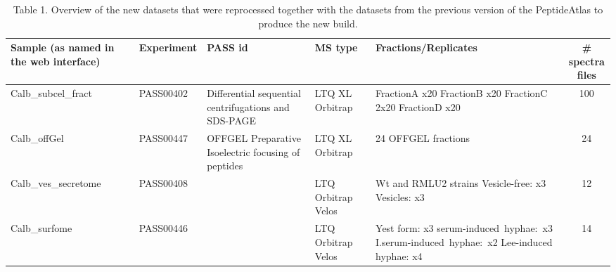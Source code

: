 \begin{otherlanguage}{british}
\begin{table}[t]
\renewcommand{\arraystretch}{1.5}
\caption*{Table 1. Overview of the new datasets that were reprocessed together with the datasets from the previous version of the PeptideAtlas to produce the
new build.}
\footnotesize
\centering
\begin{tabular}{p{2cm} p{1cm} p{2cm} p{1cm} p{2cm} c }
\hline
{\scriptsize Sample \newline (as named in \newline the web interface)} & {\scriptsize Experiment } & {\scriptsize PASS id } & {\scriptsize MS type } & {\scriptsize Fractions/Replicates } & {\scriptsize \# spectra files}\\
\hline
{\scriptsize Calb\_subcel\_fract} & {\scriptsize PASS00402} & {\scriptsize Differential \newline sequential \newline centrifugations \newline and \newline SDS-PAGE } & {\scriptsize LTQ XL  \newline Orbitrap } & {\scriptsize FractionA x20 \newline FractionB x20 \newline FractionC 2x20  \newline FractionD x20  } & 100 \\ 
{\scriptsize Calb\_offGel} & {\scriptsize PASS00447 } & {\scriptsize OFFGEL \newline Preparative \newline Isoelectric \newline focusing \newline of peptides } &  {\scriptsize LTQ XL \newline Orbitrap } & {\scriptsize 24 OFFGEL fractions} & 24\\
{\scriptsize Calb\_ves\_secretome} & {\scriptsize PASS00408} & {\scriptsize \citep{Gil-Bona2015a} } &  {\scriptsize LTQ \newline Orbitrap \newline Velos } & {\scriptsize Wt and RMLU2 strains \newline Vesicle-free: x3 \newline Vesicles: x3 } & 12\\
{\scriptsize Calb\_surfome} & {\scriptsize PASS00446} & {\scriptsize \citep{Gil-Bona2015} } & {\scriptsize LTQ \newline Orbitrap \newline Velos } & {\scriptsize Yest form: x3 \newline \mbox{serum-induced hyphae: x3}  \newline \mbox{I.serum-induced \mbox{hyphae}: x2} \newline Lee-induced \mbox{hyphae}: x4 } & 14\\


\end{tabular}
\end{table}
\end{otherlanguage}

